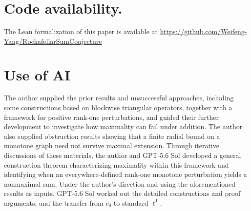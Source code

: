 \documentclass[11pt]{article}
\theoremstyle{definition}
\theoremstyle{remark}
\begin{document}
\section*{Code availability.}
The Lean formalization of this paper is available at \url{https://github.com/Weifeng-Yang/RockafellarSumConjecture}


\section*{Use of AI}
The author supplied the prior results and unsuccessful approaches, including some constructions based on blockwise triangular operators, together with a framework for positive rank-one perturbations, and guided their further development to investigate how maximality can fail under addition. The author also supplied obstruction results showing that a finite radial bound on a monotone graph need not survive maximal extension. Through iterative discussions of these materials, the author and GPT-5.6 Sol developed a general construction theorem characterizing maximality within this framework and identifying when an everywhere-defined rank-one monotone perturbation yields a nonmaximal sum.  Under the author's direction and using the aforementioned results as inputs, GPT-5.6 Sol worked out the detailed constructions and proof arguments, and the transfer from $c_0$ to standard $\ell^1$. 





\begingroup
\raggedright 

\endgroup
\end{document}
